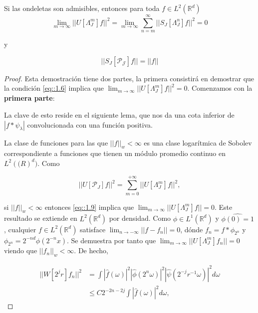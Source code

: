 \begin{teorema} \label{teoremaOndeletasAdmisibles}
\noindent Si las ondeletas son admisibles, entonces para toda $f\in L^2(\mathbb{R}^d)$
\begin{equation}
  \lim_{m\rightarrow\infty} ||U[\Lambda_J^m]f||^2=\lim_{m\rightarrow\infty} \sum_{n=m}^{\infty} ||S_J[\Lambda_J^n]f||^2=0
\end{equation}

y

\begin{equation}
  ||S_J[\mathcal{P_J}]f||=||f||
\end{equation}

\end{teorema}

\begin{proof}
  Esta demostración tiene dos partes, la primera consistirá en demostrar que la condición \eqref{eq::1.6} implica que $\lim_{m\rightarrow \infty} ||U[\Lambda_J^m]f||^2=0$. Comenzamos con la \textbf{primera parte}:

  \noindent La clave de esto reside en el siguiente lema, que nos da una cota inferior de $|f\ast\psi_\lambda|$ convolucionada con una función positiva. 
  
  \noindent La clase de funciones para las que $||f||_w < \infty$ es una clase logarítmica de Sobolev correspondiente a funciones que tienen un módulo promedio continuo en $L^2(\mathbb(R)^d)$. Como 

  $$ || U[\mathcal{P}_J]f ||^2= \sum_{m=0}^{+\infty} ||U[\Lambda_J^m]f||^2,$$

  \noindent si $||f||_w < \infty$ entonces \eqref{eq::1.9} implica que $\lim_{m\rightarrow\infty}||U[\Lambda_J^m]f||= 0$. Este resultado se extiende en $L^2(\mathbb{R}^d)$ por densidad. Como $\phi \in L^1(\mathbb{R}^d)$ y $\widehat{\phi(0)=1}$, cualquier $f\in L^2(\mathbb{R}^d)$ satisface $\lim_{n\rightarrow - \infty} ||f-f_n||=0$, dónde $f_n=f \ast \phi_{2^n}$ y $\phi_{2^n}=2^{-nd} \phi(2^{-n}x)$. Se demuestra por tanto que $\lim_{m\rightarrow \infty} ||U[\Lambda_J^m]f_n||=0$ viendo que $||f_n||_w < \infty$. De hecho, 


  \begin{align*}
      ||W[2^jr]f_n||^2 &= \int |\widehat{f}(\omega)|^2 |\widehat{\phi}(2^n \omega)|^2 |\widehat{\psi}(2^{-j}r^{-1}\omega)|^2 d\omega \\
      &\leq C 2^{-2n-2j} \int |\widehat{f}(\omega)|^2 d\omega,
  \end{align*}


\end{proof}
